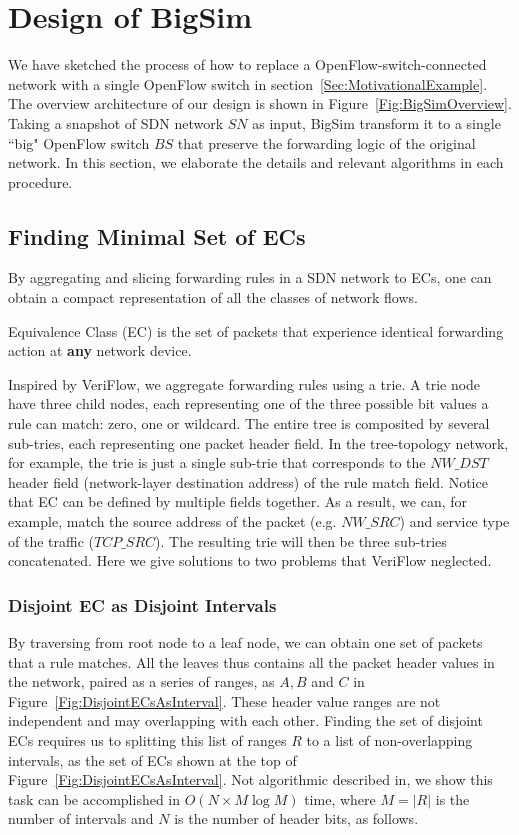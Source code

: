 \section{Design of BigSim}
\label{Sec:Design}

We have sketched the process of how to replace a OpenFlow-switch-connected network
with a single OpenFlow switch in section~\ref{Sec:MotivationalExample}.
The overview architecture of our design is shown in Figure~\ref{Fig:BigSimOverview}.
Taking a snapshot of SDN network $SN$ as input, BigSim transform it to a single ``big"
OpenFlow switch $BS$ that preserve the forwarding logic of the original network.
In this section, we elaborate the details and relevant algorithms
in each procedure.

\subsection{Finding Minimal Set of ECs}
By aggregating and slicing forwarding rules in a SDN network to ECs,
one can obtain a compact representation of all the classes of network flows.
\begin{definition}
Equivalence Class (EC) is the set of packets that
experience identical forwarding action at \textbf{any} network device.
\label{Def:EC}
\end{definition}

Inspired by VeriFlow\cite{Veriflow}, we aggregate forwarding rules using a trie.
A trie node have three child nodes, each representing one of the three possible
bit values a rule can match: zero, one or wildcard.
The entire tree is composited by several sub-tries,
each representing one packet header field.
In the tree-topology network, for example, the trie is just a single sub-trie that
corresponds to the $NW\_DST$ header field (network-layer destination address)
of the rule match field.
Notice that EC can be defined by multiple fields together.
As a result, we can, for example, match the source address of the packet (e.g. $NW\_SRC$)
and service type of the traffic ($TCP\_SRC$).
The resulting trie will then be three sub-tries concatenated.
Here we give solutions to two problems that VeriFlow neglected.

\subsubsection{Disjoint EC as Disjoint Intervals}
By traversing from root node to a leaf node, we can obtain one set of packets
that a rule matches.
All the leaves thus contains all the packet header values in the network,
paired as a series of ranges, as $A, B$ and $C$ in Figure~\ref{Fig:DisjointECsAsInterval}.
These header value ranges are not independent and may overlapping with each other.
Finding the set of disjoint ECs requires us to splitting this list of ranges $R$ to
a list of non-overlapping intervals,
as the set of ECs shown at the top of Figure~\ref{Fig:DisjointECsAsInterval}.
Not algorithmic described in\cite{Veriflow},
we show this task can be accomplished in $O(N \times M\log M)$ time,
where $M=|R|$ is the number of intervals and $N$ is the number of header bits,
as follows\cite{SplitDisjointInterval}.

